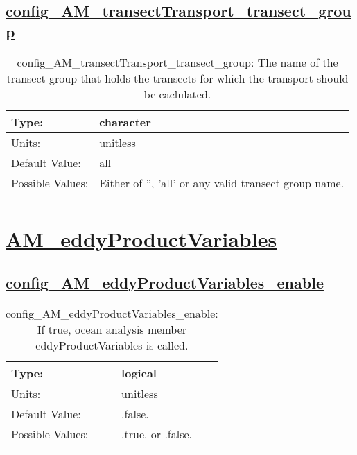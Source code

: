 \subsection[config\_AM\_transectTransport\_transect\_group]{\hyperref[sec:nm_tab_AM_transectTransport]{config\_AM\_transectTransport\_transect\_group}}
\label{subsec:nm_sec_config_AM_transectTransport_transect_group}
\begin{center}
\begin{longtable}{| p{2.0in} || p{4.0in} |}
    \hline
    Type: & character \\
    \hline
    Units: & \si{unitless} \\
    \hline
    Default Value: & all \\
    \hline
    Possible Values: & Either of '', 'all' or any valid transect group name. \\
    \hline
    \caption{config\_AM\_transectTransport\_transect\_group: The name of the transect group that holds the transects for which the transport should be caclulated.}
\end{longtable}
\end{center}
\section[AM\_eddyProductVariables]{\hyperref[sec:nm_tab_AM_eddyProductVariables]{AM\_eddyProductVariables}}
\label{sec:nm_sec_AM_eddyProductVariables}
\subsection[config\_AM\_eddyProductVariables\_enable]{\hyperref[sec:nm_tab_AM_eddyProductVariables]{config\_AM\_eddyProductVariables\_enable}}
\label{subsec:nm_sec_config_AM_eddyProductVariables_enable}
\begin{center}
\begin{longtable}{| p{2.0in} || p{4.0in} |}
    \hline
    Type: & logical \\
    \hline
    Units: & \si{unitless} \\
    \hline
    Default Value: & .false. \\
    \hline
    Possible Values: & .true. or .false. \\
    \hline
    \caption{config\_AM\_eddyProductVariables\_enable: If true, ocean analysis member eddyProductVariables is called.}
\end{longtable}
\end{center}
